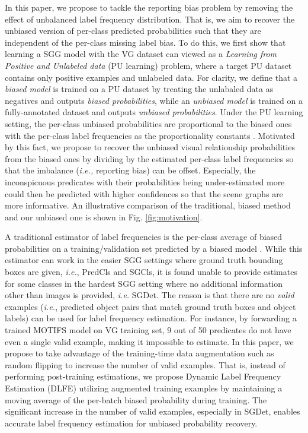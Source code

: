 \documentclass[sigconf]{acmart}
\begin{document}
In this paper, we propose to tackle the reporting bias problem by removing the effect of unbalanced label frequency distribution.
That is, we aim to recover the unbiased version of per-class predicted probabilities such that they are independent of the per-class missing label bias.
To do this, we first show that learning a SGG model with the VG dataset can viewed as a \textit{Learning from Positive and Unlabeled data} (PU learning) \cite{denis2005learning,elkan2008learning,bekker2020learning} problem, where a target PU dataset contains only positive examples and unlabeled data.
For clarity, we define that a \textit{biased model} is trained on a PU dataset by treating the unlabaled data as negatives and outputs \textit{biased probabilities}, while an \textit{unbiased model} is trained on a fully-annotated dataset and outputs \textit{unbiased probabilities}.
Under the PU learning setting, the per-class unbiased probabilities are proportional to the biased ones with the per-class label frequencies as the proportionality constants \cite{elkan2008learning}.
Motivated by this fact, we propose to recover the unbiased visual relationship probabilities from the biased ones by dividing by the estimated per-class label frequencies so that the imbalance (\emph{i.e.,} reporting bias) can be offset.
Especially, the inconspicuous predicates with their probabilities being under-estimated more could then be predicted with higher confidences so that the scene graphs are more informative.
An illustrative comparison of the traditional, biased method and our unbiased one is shown in Fig. \ref{fig:motivation}. 

A traditional estimator of label frequencies is the per-class average of biased probabilities on a training/validation set predicted by a biased model \cite{elkan2008learning}.
While this estimator can work in the easier SGG settings where ground truth bounding boxes are given, \emph{i.e.}, PredCls and SGCls, it is found unable to provide estimates for some classes in the hardest SGG setting where no additional information other than images is provided, \emph{i.e.} SGDet.
The reason is that there are no \textit{valid} examples (\emph{i.e.}, predicted object pairs that match ground truth boxes and object labels) can be used for label frequency estimation.
For instance, by forwarding a trained MOTIFS \cite{zellers2018neural} model on VG training set, 9 out of 50 predicates do not have even a single valid example, making it impossible to estimate.
In this paper, we propose to take advantage of the training-time data augmentation such as random flipping to increase the number of valid examples.
That is, instead of performing post-training estimations, we propose Dynamic Label Frequency Estimation (DLFE) utilizing augmented training examples by maintaining a moving average of the per-batch biased probability during training.
The significant increase in the number of valid examples, especially in SGDet, enables accurate label frequency estimation for unbiased probability recovery.
\end{document}
